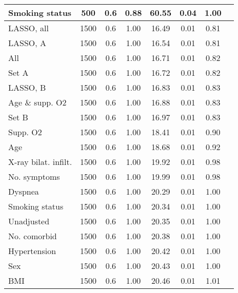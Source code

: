 \documentclass{article}
\begin{document}
{\begin{longtable}{lccccccc}
Smoking status & 500 & 0.6 & 0.88 & 60.55 & 0.04 & 1.00\\ \midrule
LASSO, all & 1500 & 0.6 & 1.00 & 16.49 & 0.01 & 0.81\\
LASSO, A & 1500 & 0.6 & 1.00 & 16.54 & 0.01 & 0.81\\
All & 1500 & 0.6 & 1.00 & 16.71 & 0.01 & 0.82\\
Set A & 1500 & 0.6 & 1.00 & 16.72 & 0.01 & 0.82\\
LASSO, B & 1500 & 0.6 & 1.00 & 16.83 & 0.01 & 0.83\\
Age \& supp. O2 & 1500 & 0.6 & 1.00 & 16.88 & 0.01 & 0.83\\
Set B & 1500 & 0.6 & 1.00 & 16.97 & 0.01 & 0.83\\
Supp. O2 & 1500 & 0.6 & 1.00 & 18.41 & 0.01 & 0.90\\
Age & 1500 & 0.6 & 1.00 & 18.68 & 0.01 & 0.92\\
X-ray bilat. infilt. & 1500 & 0.6 & 1.00 & 19.92 & 0.01 & 0.98\\
No. symptoms & 1500 & 0.6 & 1.00 & 19.99 & 0.01 & 0.98\\
Dyspnea & 1500 & 0.6 & 1.00 & 20.29 & 0.01 & 1.00\\
Smoking status & 1500 & 0.6 & 1.00 & 20.34 & 0.01 & 1.00\\
Unadjusted & 1500 & 0.6 & 1.00 & 20.35 & 0.01 & 1.00\\
No. comorbid & 1500 & 0.6 & 1.00 & 20.38 & 0.01 & 1.00\\
Hypertension & 1500 & 0.6 & 1.00 & 20.42 & 0.01 & 1.00\\
Sex & 1500 & 0.6 & 1.00 & 20.43 & 0.01 & 1.00\\
BMI & 1500 & 0.6 & 1.00 & 20.46 & 0.01 & 1.01\\
\bottomrule
\hline
\end{longtable}
}

\clearpage
\end{document}
